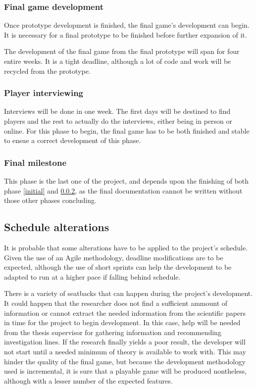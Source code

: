 \subsubsection{Final game development}

Once prototype development is finished, the final game's development can begin. It is necessary for a final prototype to be finished before further expansion of it.

The development of the final game from the final prototype will span for four entire weeks. It is a tight deadline, although a lot of code and work will be recycled from the prototype.

\subsubsection{Player interviewing}\label{playerint}

Interviews will be done in one week. The first days will be destined to find players and the rest to actually do the interviews, either being in person or online. For this phase to begin, the final game has to be both finished and stable to ensue a correct development of this phase. 

\subsubsection{Final milestone}

This phase is the last one of the project, and depends upon the finishing of both phase \ref{initial} and \ref{playerint}, as the final documentation cannot be written without those other phases concluding.

\subsection{Schedule alterations}

It is probable that some alterations have to be applied to the project's schedule. Given the use of an Agile methodology, deadline modifications are to be expected, although the use of short sprints can help the development to be adapted to run at a higher pace if falling behind schedule.

There is a variety of seatbacks that can happen during the project's development.
It could happen that the researcher does not find a sufficient ammount of information or
cannot extract the needed information from the scientific papers in time for the project
to begin development. In this case, help will be needed from the thesis supervisor for
gathering information and recommending investigation lines. If the research finally yields
a poor result, the developer will not start until a needed minimum of theory is
available to work with. This may hinder the quality of the final game, but because
the development methodology used is incremental, it is sure that a playable game
will be produced nontheless, although with a lesser number of the expected features.


